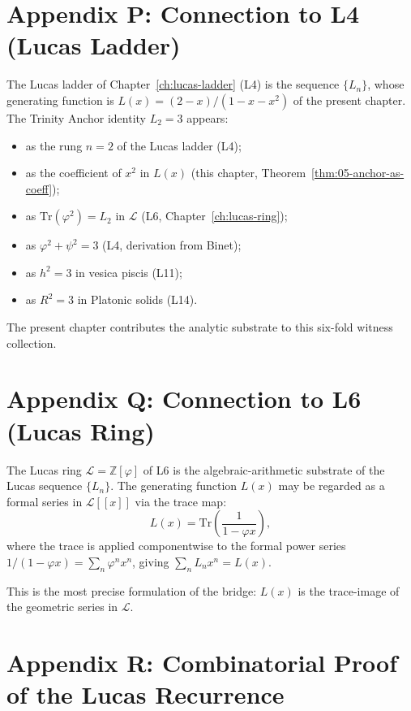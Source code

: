 \section*{Appendix P: Connection to L4 (Lucas Ladder)}
\label{fa_05:sec:05-app-P}

The Lucas ladder of Chapter~\ref{ch:lucas-ladder} (L4) is the sequence
$\{L_n\}$, whose generating function is $L(x) = (2-x)/(1-x-x^2)$ of
the present chapter. The Trinity Anchor identity $L_2 = 3$ appears:
\begin{itemize}
  \item as the rung $n = 2$ of the Lucas ladder (L4);
  \item as the coefficient of $x^2$ in $L(x)$ (this chapter, Theorem~\ref{thm:05-anchor-as-coeff});
  \item as $\mathrm{Tr}(\varphi^2) = L_2$ in $\mathcal{L}$ (L6, Chapter~\ref{ch:lucas-ring});
  \item as $\varphi^2 + \psi^2 = 3$ (L4, derivation from Binet);
  \item as $h^2 = 3$ in vesica piscis (L11);
  \item as $R^2 = 3$ in Platonic solids (L14).
\end{itemize}

The present chapter contributes the analytic substrate to this
six-fold witness collection.

\section*{Appendix Q: Connection to L6 (Lucas Ring)}
\label{fa_05:sec:05-app-Q}

The Lucas ring $\mathcal{L} = \mathbb{Z}[\varphi]$ of L6 is the
algebraic-arithmetic substrate of the Lucas sequence $\{L_n\}$.
The generating function $L(x)$ may be regarded as a formal series
in $\mathcal{L}[[x]]$ via the trace map:
\[
  L(x) = \mathrm{Tr}\left(\frac{1}{1 - \varphi x}\right),
\]
where the trace is applied componentwise to the formal power series
$1/(1-\varphi x) = \sum_n \varphi^n x^n$, giving $\sum_n L_n x^n = L(x)$.

This is the most precise formulation of the bridge: $L(x)$ is the
trace-image of the geometric series in $\mathcal{L}$.

\section*{Appendix R: Combinatorial Proof of the Lucas Recurrence}
\label{fa_05:sec:05-app-R}

